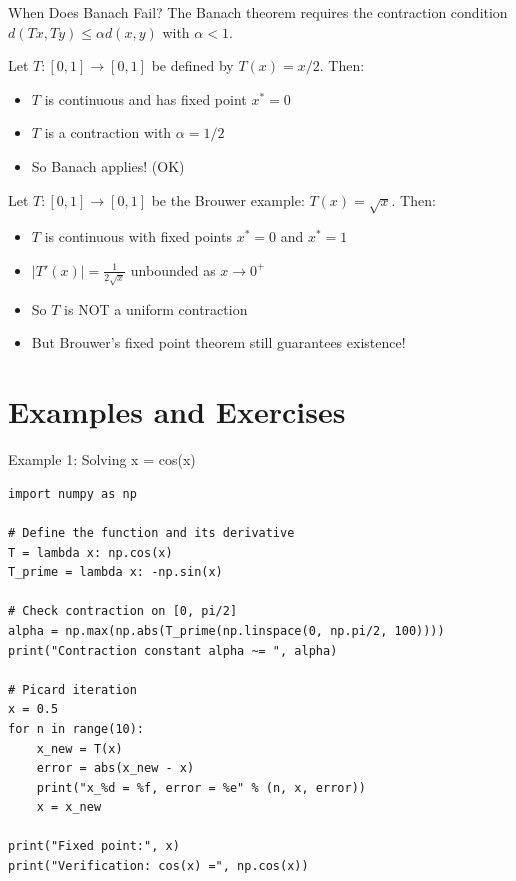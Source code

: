 \documentclass[aspectratio=169,10pt]{beamer}
\begin{document}
\begin{frame}{When Does Banach Fail?}
    The Banach theorem requires the contraction condition $d(Tx, Ty) \leq \alpha d(x,y)$ with $\alpha < 1$.

    \vspace{0.3cm}
    \begin{example}
        Let $T: [0,1] \to [0,1]$ be defined by $T(x) = x/2$. Then:
        \begin{itemize}
            \item $T$ is continuous and has fixed point $x^* = 0$
            \item $T$ is a contraction with $\alpha = 1/2$
            \item So Banach applies! (OK)
        \end{itemize}
    \end{example}

    \vspace{0.3cm}
    \begin{example}
        Let $T: [0,1] \to [0,1]$ be the Brouwer example: $T(x) = \sqrt{x}$. Then:
        \begin{itemize}
            \item $T$ is continuous with fixed points $x^* = 0$ and $x^* = 1$
            \item $|T'(x)| = \frac{1}{2\sqrt{x}}$ unbounded as $x \to 0^+$
            \item So $T$ is NOT a uniform contraction
            \item But Brouwer's fixed point theorem still guarantees existence!
        \end{itemize}
    \end{example}
\end{frame}

\section{Examples and Exercises}

\begin{frame}[fragile]{Example 1: Solving x = cos(x)}
    \begin{lstlisting}
import numpy as np

# Define the function and its derivative
T = lambda x: np.cos(x)
T_prime = lambda x: -np.sin(x)

# Check contraction on [0, pi/2]
alpha = np.max(np.abs(T_prime(np.linspace(0, np.pi/2, 100))))
print("Contraction constant alpha ~= ", alpha)

# Picard iteration
x = 0.5
for n in range(10):
    x_new = T(x)
    error = abs(x_new - x)
    print("x_%d = %f, error = %e" % (n, x, error))
    x = x_new

print("Fixed point:", x)
print("Verification: cos(x) =", np.cos(x))
    \end{lstlisting}
\end{frame}
\end{document}
